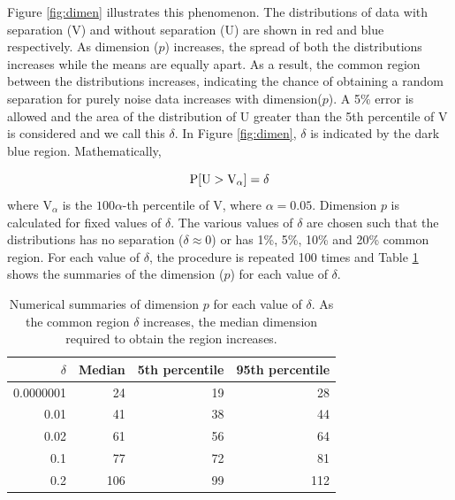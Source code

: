 Figure \ref{fig:dimen} illustrates this phenomenon. The distributions of data with separation (V) and without separation (U) are shown in red and blue respectively. As dimension ($p$) increases, the spread of both the distributions increases while the means are equally apart. As a result, the common region between the distributions increases, indicating the chance of obtaining a random separation for purely noise data increases with dimension($p$). A 5\% error is allowed and the area of the distribution of U greater than the 5th percentile of V is considered and we call this $\delta$. In Figure \ref{fig:dimen}, $\delta$ is indicated by the dark blue region. Mathematically, 

$$\hbox{P}[\mbox{U} > \mbox{V}_{\alpha}] = \delta$$ where $\mbox{V}_{\alpha}$ is the $100\alpha$-th percentile of V, where $\alpha = 0.05$.  Dimension $p$ is calculated for fixed values of $\delta$. The various values of $\delta$ are chosen such that the distributions has no separation ($\delta \approx 0$) or has 1\%, 5\%, 10\% and 20\% common region. For each value of $\delta$, the procedure is repeated 100 times and Table \ref{tab:dimen} shows the summaries of the dimension ($p$) for each value of $\delta$.

\begin{table}[htbp]
\begin{center}
\caption{Numerical summaries of dimension $p$ for each value of $\delta$. As the common region $\delta$ increases, the median dimension required to obtain the region increases.}
\begin{tabular}{rrrr}
  \hline
  \hline
  $\delta$ & Median & 5th percentile & 95th percentile \\
  \hline
  0.0000001 & 24 & 19 & 28 \\
      0.01 & 41 & 38 & 44\\
   0.02 & 61 & 56 & 64 \\
     0.1 & 77 & 72 & 81\\   
     0.2 & 106 & 99 & 112\\ 
      \hline
\end{tabular}
\label{tab:dimen}
\end{center}
\end{table}



